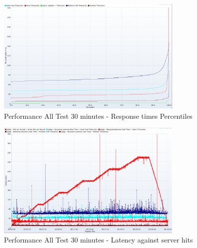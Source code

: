 \begin{figure}[htp]
    \centering
    \includegraphics[width=0.8\textwidth]{results/obs/all/obs_all_30m_response_times_percentiles.png}
    \caption{Performance All Test 30 minutes - Response times Percentiles}
    \label{fi:test_obs_all_30m_latency_percentile}
\end{figure}

\begin{figure}[htp]
    \centering
    \includegraphics[width=0.8\textwidth]{results/obs/all/obs_all_30m_res_latencies_against_hits.png}
    \caption{Performance All Test 30 minutes - Latency against server hits}
    \label{fi:test_obs_all_30m_latency}
\end{figure}

